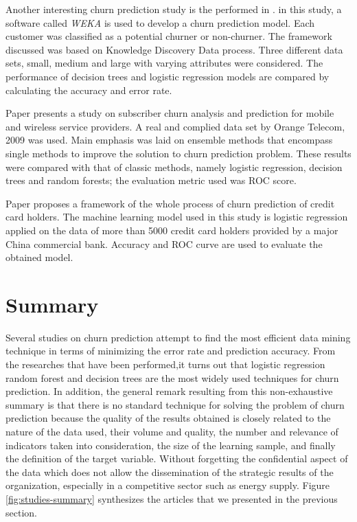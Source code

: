 \documentclass[LaM,binding=0.6cm, english]{sapthesis}
\begin{document}
\par Another interesting churn prediction study is the performed in \cite{Dahiya2015}. in this study, a software called \textit{WEKA} is used to develop a churn prediction model. Each customer was classified as a potential churner or non-churner. The framework discussed was based on Knowledge Discovery Data process. Three different data sets, small, medium and large with varying attributes were considered. The performance of decision trees and logistic regression models are compared by calculating the accuracy and error rate.

\par Paper \cite{Yabas2013} presents a study on subscriber churn analysis and prediction for mobile and wireless service providers. A real and complied data set by Orange Telecom, 2009 was used. Main emphasis was laid on ensemble methods that encompass single methods to improve the solution to churn prediction problem. These results were compared with that of classic methods, namely logistic regression, decision trees and random forests; the evaluation metric used was ROC score.

\par Paper \cite{Nie2009} proposes a framework of the whole process of churn prediction of credit card holders. The machine learning model used in this study is logistic regression applied on the data of more than 5000 credit card holders provided by a major China commercial bank. Accuracy and ROC curve are used to evaluate the obtained model.

\section{Summary}

Several studies on churn prediction attempt to find the most efficient data mining technique in terms of minimizing the error rate and prediction accuracy. From the researches that have been performed,it turns out that logistic regression random forest and decision trees are the most widely used techniques for churn prediction. In addition, the general remark resulting from this non-exhaustive summary is that there is no standard technique for solving the problem of churn prediction because the quality of the results obtained is closely related to the nature of the data used, their volume and quality, the number and relevance of indicators taken into consideration, the size of the learning sample, and finally the definition of the target variable. Without forgetting the confidential aspect of the data which does not allow the dissemination of the strategic results of the organization, especially in a competitive sector such as energy supply. Figure \ref{fig:studies-summary} synthesizes the articles that we presented in the previous section.
\end{document}
